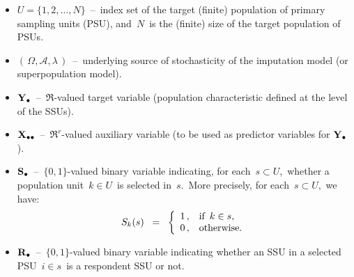 \begin{itemize}
\item
    $U = \{1,2,\ldots,N\}$
    \,--\,
    index set of the target (finite) population of primary sampling units (PSU),
    and \,$N$\, is the (finite) size of the target population of PSUs.
\item
    $\left(\,\Omega,\mathscr{A},\lambda\,\right)$
    \,--\,
    underlying source of stochasticity of the imputation model (or superpopulation model).
\item
    $\mathbf{Y}_{\bullet}$
    \,--\,
    $\Re$-valued target variable (population characteristic defined at the level of the SSUs).
\item
    $\mathbf{X}_{\bullet\bullet}$
    \,--\,
    $\Re^{r}$-valued auxiliary variable (to be used as predictor variables for $\mathbf{Y}_{\bullet}$). 
\item
    $\mathbf{S}_{\bullet}$
    \,--\,
    $\{0,1\}$-valued binary variable indicating, for each \,$s \subset U$,\,
    whether a population unit \,$k \in U$\, is selected in \,$s$.\,
    More precisely, for each \,$s \subset U$,\, we have:
    \begin{equation*}
    S_{k}(s)
    \;\; = \;\;
        \left\{\begin{array}{cl}
            1\,, & \textnormal{if \,$k \in s$},
            \\
            0\,, & \textnormal{otherwise}.
            \end{array}\right.
    \end{equation*}
\item
    $\mathbf{R}_{\bullet}$
    \,--\,
    $\{0,1\}$-valued binary variable indicating
    whether an SSU in a selected PSU \,$i \in s$\,
    is a respondent SSU or not.
\end{itemize}

